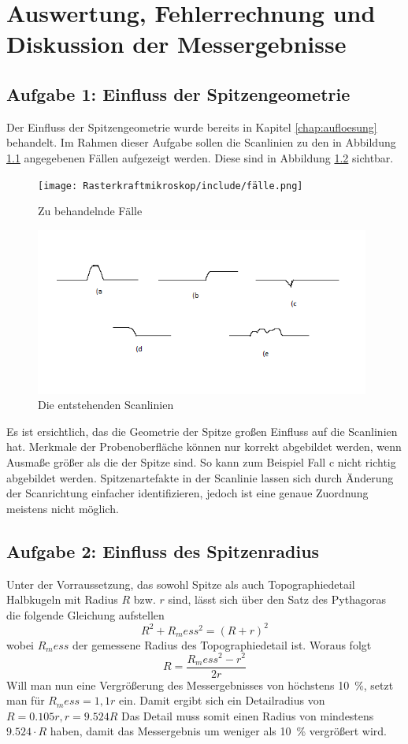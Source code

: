 \chapter{Auswertung, Fehlerrechnung und Diskussion der Messergebnisse}
\section{Aufgabe 1: Einfluss der Spitzengeometrie}
Der Einfluss der Spitzengeometrie wurde bereits in Kapitel \ref{chap:aufloesung} behandelt. Im Rahmen dieser Aufgabe sollen die Scanlinien zu den in Abbildung \ref{fig:faelle} angegebenen Fällen aufgezeigt werden. Diese sind in Abbildung \ref{fig:scanlinien} sichtbar. 
\begin{figure}[H]
    \centering
    \texttt{[image: Rasterkraftmikroskop/include/fälle.png]}
    \caption{Zu behandelnde Fälle} 
    \label{fig:faelle}
\end{figure}

\begin{figure}[H]
    \centering
    \includegraphics[width=110mm,scale=0.5]{Rasterkraftmikroskop/include/scanlinien.png}
    \caption{Die entstehenden Scanlinien} 
    \label{fig:scanlinien}
\end{figure}
Es ist ersichtlich, das die Geometrie der Spitze großen Einfluss auf die Scanlinien hat. Merkmale der Probenoberfläche können nur korrekt abgebildet werden, wenn Ausmaße größer als die der Spitze sind. So kann zum Beispiel Fall c nicht richtig abgebildet werden. Spitzenartefakte in der Scanlinie lassen sich durch Änderung der Scanrichtung einfacher identifizieren, jedoch ist eine genaue Zuordnung meistens nicht möglich.   

\section{Aufgabe 2: Einfluss des Spitzenradius}
Unter der Vorraussetzung, das sowohl Spitze als auch Topographiedetail Halbkugeln mit Radius $R$ bzw. $r$ sind, lässt sich über den Satz des Pythagoras die folgende Gleichung aufstellen
$$R^2 + R_mess^2 = (R+r)^2$$
wobei $R_mess$ der gemessene Radius des Topographiedetail ist. 
Woraus folgt
$$R = \frac{R_mess^2 - r^2}{2r}$$
Will man nun eine Vergrößerung des Messergebnisses von höchstens \SI{10}{\%}, setzt man für $R_mess = 1,1 r$ ein. 
Damit ergibt sich ein Detailradius von
$R = 0.105r, r = 9.524R$
Das Detail muss somit einen Radius von mindestens $9.524\cdot R$ haben, damit das Messergebnis um weniger als \SI{10}{\%} vergrößert wird.


